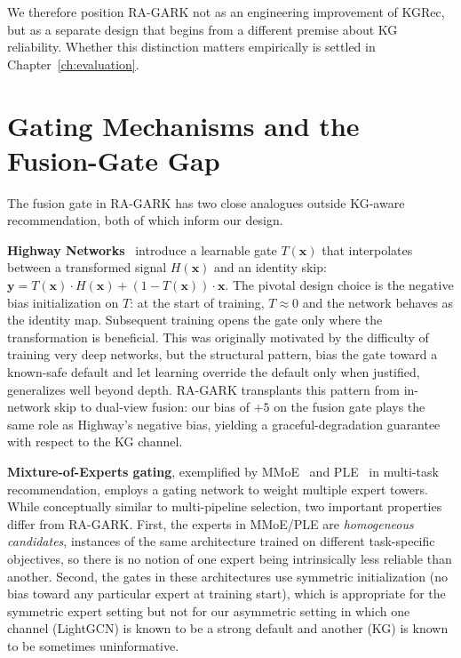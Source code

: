 We therefore position RA-GARK not as an engineering improvement of KGRec, but as a separate design that begins from a different premise about KG reliability. Whether this distinction matters empirically is settled in Chapter~\ref{ch:evaluation}.

\section{Gating Mechanisms and the Fusion-Gate Gap}
\label{sec:rw-gating}

The fusion gate in RA-GARK has two close analogues outside KG-aware recommendation, both of which inform our design.

\textbf{Highway Networks}~\cite{srivastava2015highway} introduce a learnable gate $T(\mathbf{x})$ that interpolates between a transformed signal $H(\mathbf{x})$ and an identity skip: $\mathbf{y} = T(\mathbf{x}) \cdot H(\mathbf{x}) + (1 - T(\mathbf{x})) \cdot \mathbf{x}$. The pivotal design choice is the negative bias initialization on $T$: at the start of training, $T \approx 0$ and the network behaves as the identity map. Subsequent training opens the gate only where the transformation is beneficial. This was originally motivated by the difficulty of training very deep networks, but the structural pattern, bias the gate toward a known-safe default and let learning override the default only when justified, generalizes well beyond depth. RA-GARK transplants this pattern from in-network skip to dual-view fusion: our bias of $+5$ on the fusion gate plays the same role as Highway's negative bias, yielding a graceful-degradation guarantee with respect to the KG channel.

\textbf{Mixture-of-Experts gating}, exemplified by MMoE~\cite{ma2018mmoe} and PLE~\cite{tang2020ple} in multi-task recommendation, employs a gating network to weight multiple expert towers. While conceptually similar to multi-pipeline selection, two important properties differ from RA-GARK. First, the experts in MMoE/PLE are \emph{homogeneous candidates}, instances of the same architecture trained on different task-specific objectives, so there is no notion of one expert being intrinsically less reliable than another. Second, the gates in these architectures use symmetric initialization (no bias toward any particular expert at training start), which is appropriate for the symmetric expert setting but not for our asymmetric setting in which one channel (LightGCN) is known to be a strong default and another (KG) is known to be sometimes uninformative.

